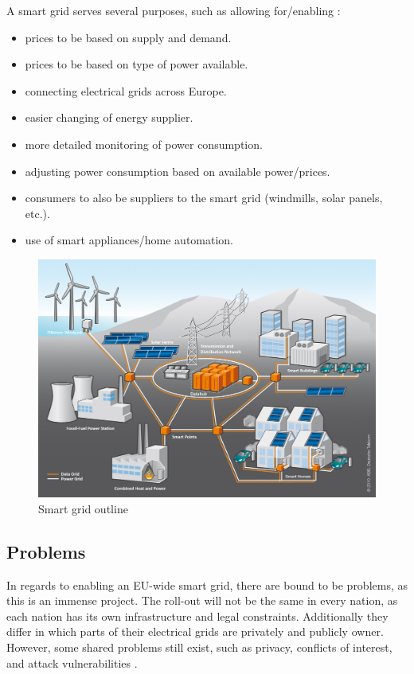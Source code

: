 A smart grid serves several purposes, such as allowing for/enabling \cite{smartgrid_gov, directive_2009_72_EC}:
\begin{itemize}
	\item prices to be based on supply and demand.
	\item prices to be based on type of power available.
	\item connecting electrical grids across Europe.
	\item easier changing of energy supplier.
	\item more detailed monitoring of power consumption.
	\item adjusting power consumption based on available power/prices.
	\item consumers to also be suppliers to the smart grid (windmills, solar panels, etc.).
	\item use of smart appliances/home automation. 
\end{itemize}

\begin{figure}
	\includegraphics[width=\textwidth]{figures/SmartGrid_Ueberblick_ohneLegende.jpg}
	\caption{Smart grid outline\protect\footnotemark}
	\label{fig:background:smartgrid}
\end{figure}

\subsection{Problems}
In regards to enabling an EU-wide smart grid, there are bound to be problems, as this is an immense project.
The roll-out will not be the same in every nation, as each nation has its own infrastructure and legal constraints.
Additionally they differ in which parts of their electrical grids are privately and publicly owner.
However, some shared problems still exist, such as privacy, conflicts of interest, and attack vulnerabilities \cite{offswitch, smart_meter_survey, security_economics}.

